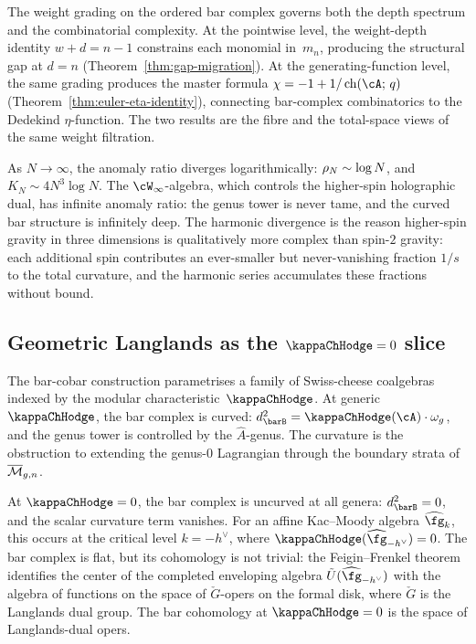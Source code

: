The weight grading on the ordered bar complex governs both the
depth spectrum and the combinatorial complexity. At the
pointwise level, the weight-depth identity $w + d = n - 1$
constrains each monomial in~$m_n$, producing the structural
gap at $d = n$ (Theorem~\ref{thm:gap-migration}). At the
generating-function level, the same grading produces the master
formula $\chi = -1 + 1/\operatorname{ch}(\cA;\,q)$
(Theorem~\ref{thm:euler-eta-identity}), connecting bar-complex
combinatorics to the Dedekind $\eta$-function. The two results
are the fibre and the total-space views of the same weight
filtration.

As $N \to \infty$, the anomaly ratio diverges logarithmically:
$\rho_N \sim \log N$, and $K_N \sim 4N^3\log N$. The
$\cW_\infty$-algebra, which controls the higher-spin holographic
dual, has infinite anomaly ratio: the genus tower is never tame, and
the curved bar structure is infinitely deep. The harmonic divergence
is the reason higher-spin gravity in three dimensions is qualitatively
more complex than spin-$2$ gravity: each additional spin contributes
an ever-smaller but never-vanishing fraction $1/s$ to the total
curvature, and the harmonic series accumulates these fractions without
bound.

\subsection{Geometric Langlands as the $\kappaChHodge=0$ slice}

The bar-cobar construction parametrises a family of Swiss-cheese
coalgebras indexed by the modular characteristic~$\kappaChHodge$. At
generic~$\kappaChHodge$, the bar complex is curved: $d_{\barB}^2 =
\kappaChHodge(\cA)\cdot\omega_g$, and the genus tower is controlled by the
$\hat{A}$-genus. The curvature is the obstruction to extending the
genus-$0$ Lagrangian through the boundary strata of~$\overline{\mathcal M}_{g,n}$.

At $\kappaChHodge = 0$, the bar complex is uncurved at all genera:
$d_{\barB}^2 = 0$, and the scalar curvature term vanishes. For an affine
Kac--Moody algebra $\widehat{\fg}_k$, this occurs at the critical
level $k = -h^\vee$, where $\kappaChHodge(\widehat{\fg}_{-h^\vee}) = 0$.
The bar complex is flat, but its cohomology is not trivial: the
Feigin--Frenkel theorem identifies the center of the completed
enveloping algebra $\tilde{U}(\widehat{\fg}_{-h^\vee})$ with the
algebra of functions on the space of $\check{G}$-opers on the formal
disk, where $\check{G}$ is the Langlands dual group. The bar
cohomology at $\kappaChHodge = 0$ is the space of Langlands-dual opers.

